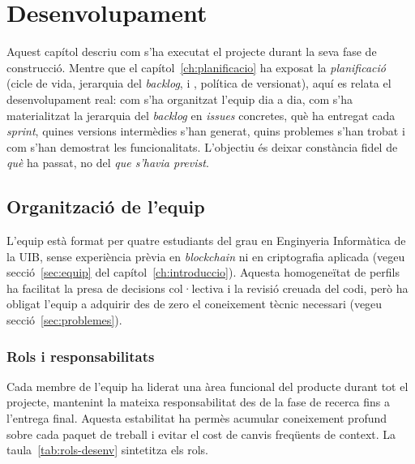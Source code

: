 

\chapter{Desenvolupament}
\label{ch:desenvolupament}

Aquest capítol descriu com s'ha executat el projecte durant la seva fase de construcció.
Mentre que el capítol~\ref{ch:planificacio} ha exposat la \emph{planificació} (cicle de vida, jerarquia del
\emph{backlog},  i , política de versionat), aquí es relata el desenvolupament real: com s'ha
organitzat l'equip dia a dia, com s'ha materialitzat la jerarquia del \emph{backlog} en \emph{issues} concretes, què ha
entregat cada \emph{sprint}, quines versions intermèdies s'han generat, quins problemes s'han trobat i com s'han
demostrat les funcionalitats.
L'objectiu és deixar constància fidel de \emph{què} ha passat, no del \emph{que s'havia previst}.



\section{Organització de l'equip}
\label{sec:organitzacio-equip}

L'equip està format per quatre estudiants del grau en Enginyeria Informàtica de la \ac{UIB}, sense experiència prèvia en
\emph{blockchain} ni en criptografia aplicada (vegeu secció~\ref{sec:equip} del capítol~\ref{ch:introduccio}).
Aquesta homogeneïtat de perfils ha facilitat la presa de decisions col·lectiva i la revisió creuada del codi, però ha
obligat l'equip a adquirir des de zero el coneixement tècnic necessari (vegeu secció~\ref{sec:problemes}).

\subsection{Rols i responsabilitats}
\label{subsec:rols-i-responsabilitats}

Cada membre de l'equip ha liderat una àrea funcional del producte durant tot el projecte, mantenint la mateixa
responsabilitat des de la fase de recerca fins a l'entrega final.
Aquesta estabilitat ha permès acumular coneixement profund sobre cada paquet de treball i evitar el cost de canvis
freqüents de context.
La taula~\ref{tab:rols-desenv} sintetitza els rols.

